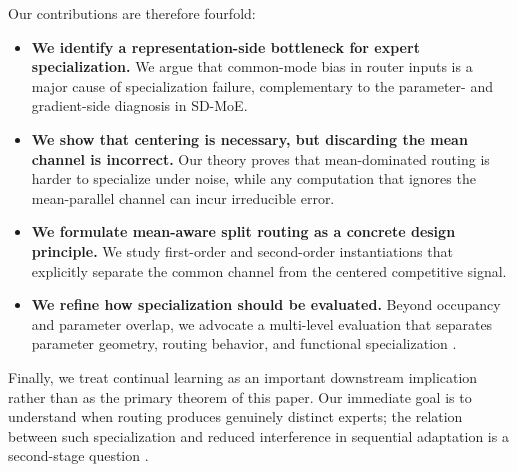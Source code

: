 Our contributions are therefore fourfold:
\begin{itemize}
    \item \textbf{We identify a representation-side bottleneck for expert specialization.} We argue that common-mode bias in router inputs is a major cause of specialization failure, complementary to the parameter- and gradient-side diagnosis in SD-MoE.
    \item \textbf{We show that centering is necessary, but discarding the mean channel is incorrect.} Our theory proves that mean-dominated routing is harder to specialize under noise, while any computation that ignores the mean-parallel channel can incur irreducible error.
    \item \textbf{We formulate mean-aware split routing as a concrete design principle.} We study first-order and second-order instantiations that explicitly separate the common channel from the centered competitive signal.
    \item \textbf{We refine how specialization should be evaluated.} Beyond occupancy and parameter overlap, we advocate a multi-level evaluation that separates parameter geometry, routing behavior, and functional specialization .
\end{itemize}

Finally, we treat continual learning as an important downstream implication rather than as the primary theorem of this paper. Our immediate goal is to understand when routing produces genuinely distinct experts; the relation between such specialization and reduced interference in sequential adaptation is a second-stage question .
